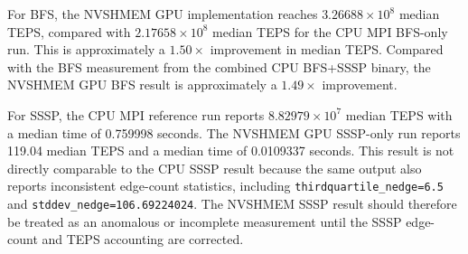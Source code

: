 \documentclass{article}
\begin{document}
For BFS, the NVSHMEM GPU implementation reaches $3.26688 \times 10^{8}$ median TEPS, compared with $2.17658 \times 10^{8}$ median TEPS for the CPU MPI BFS-only run. This is approximately a $1.50\times$ improvement in median TEPS. Compared with the BFS measurement from the combined CPU BFS+SSSP binary, the NVSHMEM GPU BFS result is approximately a $1.49\times$ improvement.

For SSSP, the CPU MPI reference run reports $8.82979 \times 10^{7}$ median TEPS with a median time of 0.759998 seconds. The NVSHMEM GPU SSSP-only run reports 119.04 median TEPS and a median time of 0.0109337 seconds. This result is not directly comparable to the CPU SSSP result because the same output also reports inconsistent edge-count statistics, including \texttt{thirdquartile\_nedge=6.5} and \texttt{stddev\_nedge=106.69224024}. The NVSHMEM SSSP result should therefore be treated as an anomalous or incomplete measurement until the SSSP edge-count and TEPS accounting are corrected.
\end{document}
